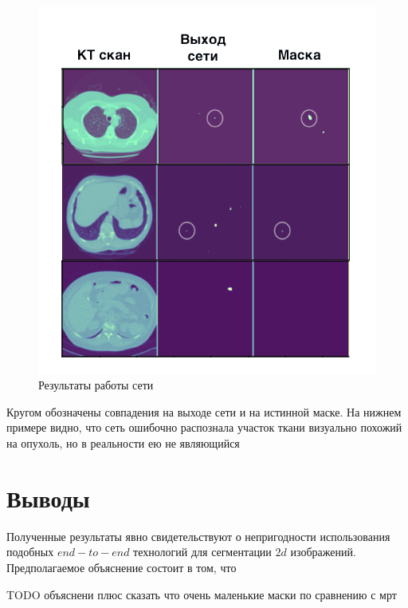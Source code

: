 \begin{figure}[!h]
\includegraphics[width=\linewidth]{2d-seg-results.png}
\caption{Результаты работы сети}\label{mirskiy-cgan-architecture}
\centering
\end{figure}

Кругом обозначены совпадения на выходе сети и на истинной маске. На нижнем примере видно, что сеть ошибочно распознала участок ткани визуально похожий на опухоль, но в реальности ею не являющийся

\section{Выводы}

Полученные результаты явно свидетельствуют о непригодности использования подобных $end-to-end$ технологий для сегментации $2d$ изображений. Предполагаемое объяснение состоит в том, что 

TODO объяснени плюс сказать что очень маленькие маски по сравнению с мрт